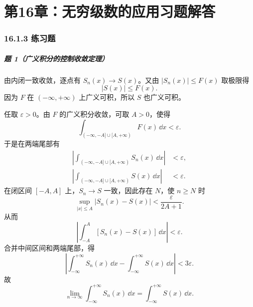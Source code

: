 
\chapter*{第16章：无穷级数的应用习题解答}

\subsection*{16.1.3 练习题}

\paragraph{题 1（广义积分的控制收敛定理）}
\begin{xsolution}
由内闭一致收敛，逐点有 $S_n(x)\to S(x)$。又由 $|S_n(x)|\leqslant F(x)$ 取极限得
\[
  |S(x)|\leqslant F(x).
\]
因为 $F$ 在 $(-\infty,+\infty)$ 上广义可积，所以 $S$ 也广义可积。

任取 $\varepsilon>0$。由 $F$ 的广义积分收敛，可取 $A>0$，使得
\[
  \int_{(-\infty,-A]\cup[A,+\infty)}F(x)\,\dd x<\varepsilon.
\]
于是在两端尾部有
\[
\begin{aligned}
  \left|\int_{(-\infty,-A]\cup[A,+\infty)}S_n(x)\,\dd x\right|&<\varepsilon,\\
  \left|\int_{(-\infty,-A]\cup[A,+\infty)}S(x)\,\dd x\right|&<\varepsilon.
\end{aligned}
\]
在闭区间 $[-A,A]$ 上，$S_n\to S$ 一致，因此存在 $N$，使 $n\geqslant N$ 时
\[
  \sup_{|x|\leqslant A}|S_n(x)-S(x)|<\frac{\varepsilon}{2A+1}.
\]
从而
\[
  \left|\int_{-A}^A[S_n(x)-S(x)]\,\dd x\right|<\varepsilon.
\]
合并中间区间和两端尾部，得
\[
  \left|\int_{-\infty}^{+\infty}S_n(x)\,\dd x-
  \int_{-\infty}^{+\infty}S(x)\,\dd x\right|<3\varepsilon.
\]
故
\[
  \lim_{n\to\infty}\int_{-\infty}^{+\infty}S_n(x)\,\dd x
  =\int_{-\infty}^{+\infty}S(x)\,\dd x.
\]
\end{xsolution}

